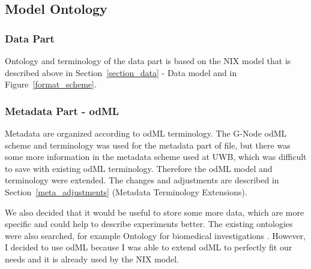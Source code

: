 \documentclass[conference]{IEEEtran}
\begin{document}
\subsection{Model Ontology}
\subsubsection{Data Part}
Ontology and terminology of the data part is based on the NIX model that is described above in Section~\ref{section_data} - Data model and in Figure~\ref{format_scheme}.

\subsubsection{Metadata Part - odML}
\label{odml_section}
Metadata are organized according to odML terminology. The G-Node odML scheme and terminology was used for the metadata part of file, but there was some more information in the metadata scheme used at UWB, which was difficult to save with existing odML terminology. Therefore the odML model and terminology were extended.
The changes and adjustments are described in Section~\ref{meta_adjustments} (Metadata Terminology Extensions).

 We also decided that it would be useful to store some more data, which are more specific and could help to describe experiments better. The existing ontologies were also searched, for example Ontology for biomedical investigations \cite{oen} \cite{Brinkman2010}. However, I decided to use odML because I was able to extend odML to perfectly fit our needs and it is already used by the NIX model.
\end{document}

